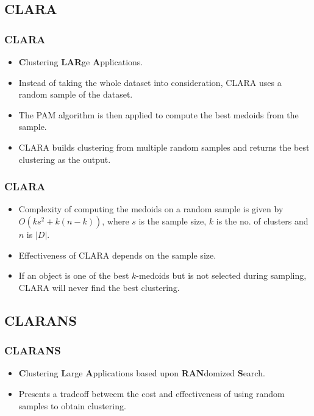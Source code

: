 \documentclass{beamer}
\begin{document}
\subsection{CLARA}
\begin{frame}
    \frametitle{CLARA}
    \begin{itemize}
        \item \textbf{C}lustering \textbf{LAR}ge \textbf{A}pplications.
        \item Instead of taking the whole dataset into consideration, CLARA uses a random sample of the dataset.
        \item The PAM algorithm is then applied to compute the best medoids from the sample.
        \item CLARA builds clustering from multiple random samples and returns the best clustering as the output. 
    \end{itemize}
\end{frame}

\begin{frame}
    \frametitle{CLARA}
    \begin{itemize}
        \item Complexity of computing the medoids on a random sample is given by $O(ks^2 + k(n-k))$, where $s$ is the sample size, $k$ is the no. of clusters and $n$ is $|D|$.
        \item Effectiveness of CLARA depends on the sample size.
        \item If an object is one of the best $k$-medoids but is not selected during sampling, CLARA will never find the best clustering.
    \end{itemize}
\end{frame}

\subsection{CLARANS}
\begin{frame}
    \frametitle{CLARANS}
    \begin{itemize}
        \item {\textbf C}lustering {\textbf{L}}arge {\textbf A}pplications based upon {\textbf{RAN}}domized {\textbf S}earch.
        \item Presents a tradeoff betweem the cost and effectiveness of using random samples to obtain clustering.
    \end{itemize}       
\end{frame}
\end{document}
